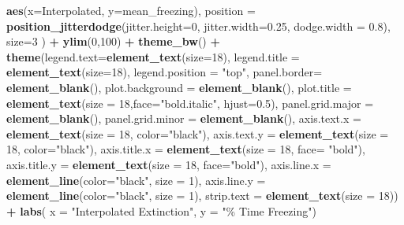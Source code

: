 \documentclass[
]{article}
\newenvironment{Shaded}{\begin{snugshade}}{\end{snugshade}}
\newcommand{\AttributeTok}[1]{\textcolor[rgb]{0.13,0.29,0.53}{#1}}
\newcommand{\DecValTok}[1]{\textcolor[rgb]{0.00,0.00,0.81}{#1}}
\newcommand{\FloatTok}[1]{\textcolor[rgb]{0.00,0.00,0.81}{#1}}
\newcommand{\FunctionTok}[1]{\textcolor[rgb]{0.13,0.29,0.53}{\textbf{#1}}}
\newcommand{\NormalTok}[1]{#1}
\newcommand{\SpecialCharTok}[1]{\textcolor[rgb]{0.81,0.36,0.00}{\textbf{#1}}}
\newcommand{\StringTok}[1]{\textcolor[rgb]{0.31,0.60,0.02}{#1}}
\begin{document}
\begin{Shaded}
\begin{Highlighting}[]
    \FunctionTok{aes}\NormalTok{(}\AttributeTok{x=}\NormalTok{Interpolated, }\AttributeTok{y=}\NormalTok{mean\_freezing), }
    \AttributeTok{position =} \FunctionTok{position\_jitterdodge}\NormalTok{(}\AttributeTok{jitter.height=}\DecValTok{0}\NormalTok{, }\AttributeTok{jitter.width=}\FloatTok{0.25}\NormalTok{,}
                                    \AttributeTok{dodge.width =} \FloatTok{0.8}\NormalTok{),}
    \AttributeTok{size=}\DecValTok{3}
\NormalTok{  ) }\SpecialCharTok{+}
  \FunctionTok{ylim}\NormalTok{(}\DecValTok{0}\NormalTok{,}\DecValTok{100}\NormalTok{) }\SpecialCharTok{+}
  \FunctionTok{theme\_bw}\NormalTok{() }\SpecialCharTok{+} 
  \FunctionTok{theme}\NormalTok{(}\AttributeTok{legend.text=}\FunctionTok{element\_text}\NormalTok{(}\AttributeTok{size=}\DecValTok{18}\NormalTok{),}
        \AttributeTok{legend.title =} \FunctionTok{element\_text}\NormalTok{(}\AttributeTok{size=}\DecValTok{18}\NormalTok{),}
        \AttributeTok{legend.position =} \StringTok{"top"}\NormalTok{,}
        \AttributeTok{panel.border=} \FunctionTok{element\_blank}\NormalTok{(),}
        \AttributeTok{plot.background =} \FunctionTok{element\_blank}\NormalTok{(),}
        \AttributeTok{plot.title =} \FunctionTok{element\_text}\NormalTok{(}\AttributeTok{size =} \DecValTok{18}\NormalTok{,}\AttributeTok{face=}\StringTok{"bold.italic"}\NormalTok{, }\AttributeTok{hjust=}\FloatTok{0.5}\NormalTok{),}
        \AttributeTok{panel.grid.major =} \FunctionTok{element\_blank}\NormalTok{(),}
        \AttributeTok{panel.grid.minor =} \FunctionTok{element\_blank}\NormalTok{(),}
        \AttributeTok{axis.text.x =} \FunctionTok{element\_text}\NormalTok{(}\AttributeTok{size =} \DecValTok{18}\NormalTok{, }\AttributeTok{color=}\StringTok{"black"}\NormalTok{),}
        \AttributeTok{axis.text.y =} \FunctionTok{element\_text}\NormalTok{(}\AttributeTok{size =} \DecValTok{18}\NormalTok{, }\AttributeTok{color=}\StringTok{"black"}\NormalTok{),}
        \AttributeTok{axis.title.x =} \FunctionTok{element\_text}\NormalTok{(}\AttributeTok{size =} \DecValTok{18}\NormalTok{, }\AttributeTok{face=} \StringTok{"bold"}\NormalTok{),}
        \AttributeTok{axis.title.y =} \FunctionTok{element\_text}\NormalTok{(}\AttributeTok{size =} \DecValTok{18}\NormalTok{, }\AttributeTok{face=}\StringTok{"bold"}\NormalTok{),}
        \AttributeTok{axis.line.x =} \FunctionTok{element\_line}\NormalTok{(}\AttributeTok{color=}\StringTok{"black"}\NormalTok{, }\AttributeTok{size =} \DecValTok{1}\NormalTok{),}
        \AttributeTok{axis.line.y =} \FunctionTok{element\_line}\NormalTok{(}\AttributeTok{color=}\StringTok{"black"}\NormalTok{, }\AttributeTok{size =} \DecValTok{1}\NormalTok{),}
        \AttributeTok{strip.text =} \FunctionTok{element\_text}\NormalTok{(}\AttributeTok{size =} \DecValTok{18}\NormalTok{)) }\SpecialCharTok{+} 
  \FunctionTok{labs}\NormalTok{(}
    \AttributeTok{x =} \StringTok{"Interpolated Extinction"}\NormalTok{,}
    \AttributeTok{y =} \StringTok{"\% Time Freezing"}\NormalTok{)}
\end{Highlighting}
\end{Shaded}
\end{document}
